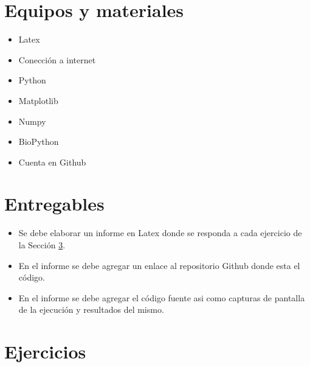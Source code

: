 \documentclass{article}
\begin{document}
	\section{Equipos y materiales}
	\begin{itemize}
		\item Latex
		\item Conección a internet 
		\item Python
		\item Matplotlib 
		\item Numpy 
		\item BioPython
		\item Cuenta en Github
	\end{itemize}
	
	\section{Entregables}
	\begin{itemize}
		\item Se debe elaborar un informe en Latex donde se responda a cada ejercicio de la Sección \ref{sec:ejercicios}.
		\item En el informe se debe agregar un enlace al repositorio Github donde esta el código.
		\item En el informe se debe agregar el código fuente asi como capturas de pantalla de la ejecución y resultados del mismo.
	\end{itemize}
	
	
	
	
	\clearpage
	
	
	\section{Ejercicios}\label{sec:ejercicios}
		
\end{document}
